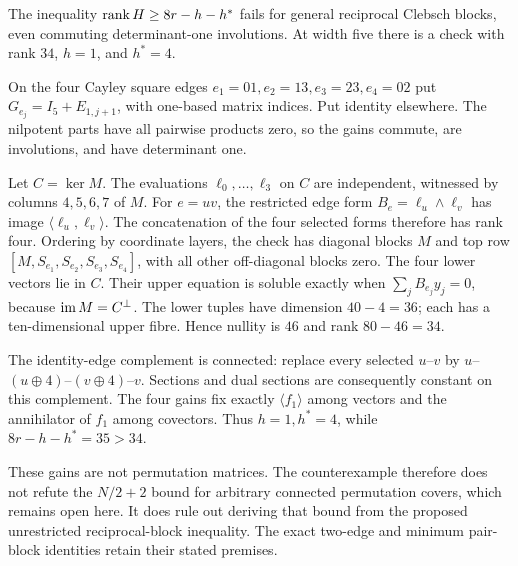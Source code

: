 \begin{proposition}
\label{prop:clebsch-counterexample}
\notformalized
The inequality $\operatorname{rank} H\ge8r-h-h^*$ fails for general reciprocal
Clebsch blocks, even commuting determinant-one involutions. At width
five there is a check with rank $34$, $h=1$, and $h^*=4$.
\end{proposition}
\begin{informalproof}
On the four Cayley square edges $e_1=01,e_2=13,e_3=23,e_4=02$ put
$G_{e_j}=I_5+E_{1,j+1}$, with one-based matrix indices. Put identity
elsewhere. The nilpotent parts have all pairwise products zero, so
the gains commute, are involutions, and have determinant one.

Let $C=\ker M$. The evaluations $\ell_0,\ldots,\ell_3$ on $C$
are independent, witnessed by columns $4,5,6,7$ of $M$.
For $e=uv$, the restricted edge form $B_e=\ell_u\wedge\ell_v$
has image $\langle\ell_u,\ell_v\rangle$. The concatenation of the
four selected forms therefore has rank four. Ordering by coordinate
layers, the check has diagonal blocks $M$ and top row
$[M,S_{e_1},S_{e_2},S_{e_3},S_{e_4}]$, with all other off-diagonal
blocks zero. The four lower vectors lie in $C$. Their upper equation
is soluble exactly when $\sum_jB_{e_j}y_j=0$, because
$\operatorname{im} M=C^\perp$. The lower tuples have dimension $40-4=36$;
each has a ten-dimensional upper fibre. Hence nullity is $46$ and
rank $80-46=34$.

The identity-edge complement is connected: replace every selected
$u$--$v$ by $u$--$(u\oplus4)$--$(v\oplus4)$--$v$.
Sections and dual sections are consequently constant on this complement.
The four gains fix exactly $\langle f_1\rangle$ among vectors and
the annihilator of $f_1$ among covectors. Thus $h=1,h^*=4$, while
$8r-h-h^*=35>34$.
\end{informalproof}

These gains are not permutation matrices. The counterexample therefore
does not refute the $N/2+2$ bound for arbitrary connected permutation
covers, which remains open here. It does rule out deriving that bound
from the proposed unrestricted reciprocal-block inequality. The exact
two-edge and minimum pair-block identities retain their stated premises.
